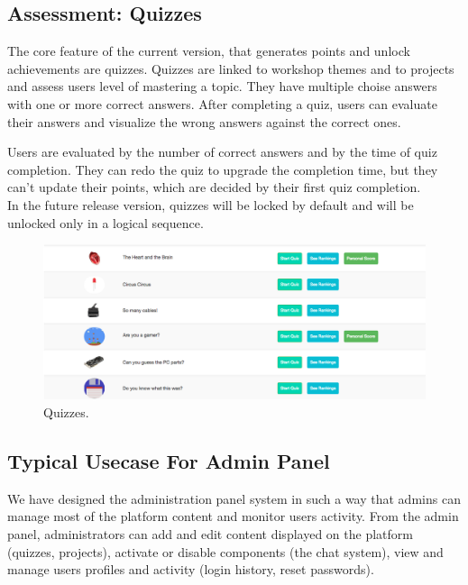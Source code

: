 \subsection{Assessment: Quizzes}

The core feature of the current version, that generates points and unlock achievements are quizzes. Quizzes are linked to workshop themes and to projects and assess users level of mastering a topic. They have multiple choise answers with one or more correct answers.
After completing a quiz, users can evaluate their answers and visualize the wrong answers against the correct ones. 

Users are evaluated by the number of correct answers and by the time of quiz completion. They can redo the quiz to upgrade the completion time, but they can't update their points, which are decided by their first quiz completion. \\

In the future release version, quizzes will be locked by default and will be unlocked only in a logical sequence. 

\begin{figure}
\includegraphics[width=1\linewidth]{images/ui/Quizzes.png}
\caption{Quizzes.}
\label{fig:Quizzes}
\end{figure}


\subsection{Typical Usecase For Admin Panel}

We have designed the administration panel system in such a way that admins can manage most of the platform content and monitor users activity. From the admin panel, administrators can add and edit content displayed on the platform (quizzes, projects), activate or disable components (the chat system), view and manage users profiles and activity (login history, reset passwords).\\

